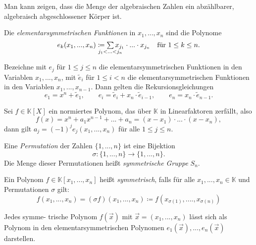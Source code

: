 \documentclass{cheat-sheet}
\newcommand{\K}{\mathbb{K}} %
\begin{document}
\begin{bem}
  Man kann zeigen, dass die Menge der algebraischen Zahlen ein abzählbarer, algebraisch abgeschlossener Körper ist.
\end{bem}


\begin{defn}
  Die \emph{elementarsymmetrischen Funktionen} in $x_1, ..., x_n$ sind die Polynome
  \[
    e_k(x_1, ..., x_n) \coloneqq \sum_{\mathclap{j_1 < ... < j_n}} x_{j_1} \cdot ... \cdot x_{j_n}
    \quad \text{für $1 \leq k \leq n$.}
  \]
\end{defn}

\begin{bem}
  Bezeichne mit $e_j$ für $1 \leq j \leq n$ die elementarsymmetrischen Funktionen in den Variablen $x_1, ..., x_n$, mit $\tilde{e}_i$ für $1 \leq i < n$ die elementarsymmetrischen Funktionen in den Variablen $x_1, ..., x_{n-1}$. Dann gelten die Rekursionsgleichungen
  \[
    e_1 = x^n + \tilde{e}_1, \qquad
    e_i = \tilde{e}_i + x_n \cdot \tilde{e}_{i-1}, \qquad
    e_n = x_n \cdot \tilde{e}_{n-1}.
  \]
\end{bem}

\begin{satz}[Vieta]
  Sei $f \in \K[X]$ ein normiertes Polynom, das über $\K$ in Linearfaktoren zerfällt, also
  \[ f(x) = x^n + a_1 x^{n-1} + ... + a_n = (x-x_1) \cdot ... \cdot (x-x_n), \]
  dann gilt $a_j = (-1)^j e_j(x_1, ..., x_n)$ für alle $1 \leq j \leq n$.
\end{satz}

\begin{defn}
  Eine \emph{Permutation} der Zahlen $\{ 1, ..., n \}$ ist eine Bijektion
  \[ \sigma : \{ 1, ..., n \} \to \{ 1, ..., n \}. \]
  Die Menge dieser Permutationen heißt \emph{symmetrische Gruppe} $S_n$.
\end{defn}

\begin{defn}
  Ein Polynom $f \in \K[x_1, ..., x_n]$ heißt \emph{symmetrisch}, falls für alle $x_1, ..., x_n \in \K$ und Permutationen $\sigma$ gilt:
  \[ f(x_1, ..., x_n) = (\sigma f)(x_1, ..., x_n) \coloneqq f(x_{\sigma(1)}, ...., x_{\sigma(n)}) \]
\end{defn}


\begin{satz}
  Jedes symme- trische Polynom $f(\vec{x})$ mit $\vec{x} = (x_1, ..., x_n)$ lässt sich als Polynom in den elementarsymmetrischen Polynomen $e_1(\vec{x}), ..., e_n(\vec{x})$ darstellen.
\end{satz}
\end{document}
